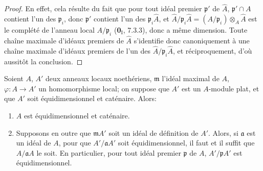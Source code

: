 \begin{proof}
En effet, cela résulte du fait que pour tout idéal premier $\mathfrak p'$ de
$\widehat A$, $\mathfrak p'\cap A$ contient l'un des $\mathfrak p_i$, donc
$\mathfrak p'$ contient l'un des $\mathfrak p_i\widehat A$, et
$\widehat A/\mathfrak p_i\widehat A=(A/\mathfrak p_i)\otimes_A\widehat A$
est le complété de l'anneau local $A/\mathfrak p_i$ (\textbf{0}$_{\mathrm I}$,
7.3.3), donc a même dimension. Toute chaîne maximale d'idéaux premiers de
$\widehat A$ s'identifie donc canoniquement à une chaîne maximale d'idéaux
premiers de l'un des $\widehat A/\mathfrak p_i\widehat A$, et réciproquement,
d'où aussitôt la conclusion.
\end{proof}

\begin{proposition}[7.1.3]
\label{IV.2.s7.1.3-fr}
Soient $A$, $A'$ deux anneaux locaux noethériens, $\mathfrak m$ l'idéal
maximal de $A$, $\varphi:A\to A'$ un homomorphisme local; on suppose que $A'$
est un $A$-module plat, et que $A'$ soit équidimensionnel et caténaire. Alors:
\begin{enumerate}
\item[\textup{(i)}] $A$ est équidimensionnel et caténaire.
\item[\textup{(ii)}] Supposons en outre que $\mathfrak mA'$ soit un idéal de définition de
$A'$. Alors, si $\mathfrak a$ est un idéal de $A$, pour que
$A'/\mathfrak aA'$ soit équidimensionnel, il faut et il suffit que
$A/\mathfrak aA$ le soit. En particulier, pour tout idéal premier
$\mathfrak p$ de $A$, $A'/\mathfrak pA'$ est équidimensionnel.
\end{enumerate}
\end{proposition}

